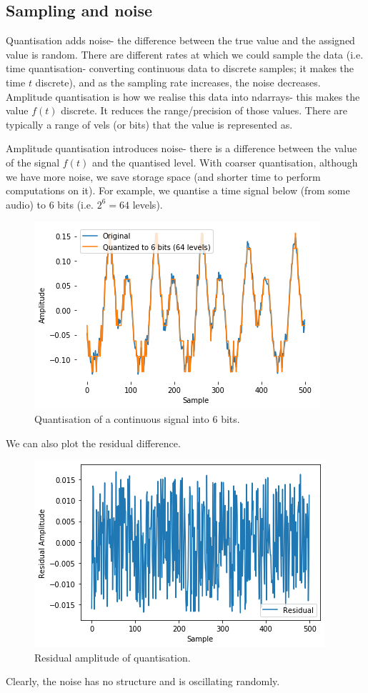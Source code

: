 \documentclass[a4paper, openany]{memoir}
\begin{document}
\subsection{Sampling and noise}
Quantisation adds noise- the difference between the true value and the assigned value is random. There are different rates at which we could sample the data (i.e. time quantisation- converting continuous data to discrete samples; it makes the time $t$ discrete), and as the sampling rate increases, the noise decreases. Amplitude quantisation is how we realise this data into ndarrays- this makes the value $f(t)$ discrete. It reduces the range/precision of those values. There are typically a range of vels (or bits) that the value is represented as.

Amplitude quantisation introduces noise- there is a difference between the value of the signal $f(t)$ and the quantised level. With coarser quantisation, although we have more noise, we save storage space (and shorter time to perform computations on it). For example, we quantise a time signal below (from some audio) to 6 bits (i.e. $2^6 = 64$ levels).
\begin{figure}[H]
    \centering
    \includegraphics[scale=0.6]{src/6.1 quantised to 6 bits.png}
    \caption{Quantisation of a continuous signal into 6 bits.}
\end{figure}
\noindent We can also plot the residual difference.
\begin{figure}[H]
    \centering
    \includegraphics[scale=0.6]{src/6.2 residual amplitude.png}
    \caption{Residual amplitude of quantisation.}
\end{figure}
\noindent Clearly, the noise has no structure and is oscillating randomly.
\end{document}
